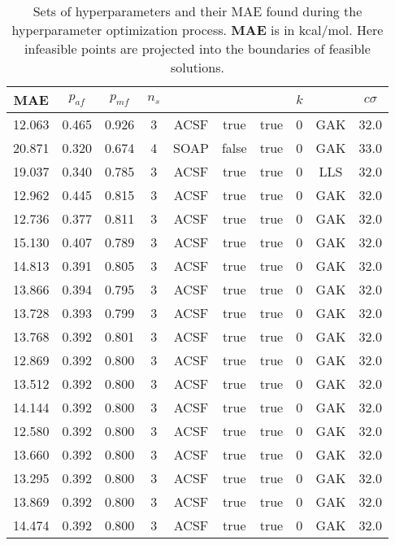 \documentclass[12pt]{article}
\begin{document}
\begin{table}[H]
	\centering
	\caption{Sets of hyperparameters and their MAE found during the hyperparameter optimization process. \textbf{MAE} is in kcal/mol. Here infeasible points are projected into the boundaries of feasible solutions.} 
	\begin{tabular}{|c|c|c|c|c|c|c|c|c|c|}
		\hline
		\textbf{MAE}	& $p_{af}$ & $p_{mf}$ & $n_s$ & \codeword{ftype} & \codeword{norm_af} & \codeword{norm_mf} & $k$ & \codeword{model} & $c\sigma$	\\ \hline
		12.063	& 0.465	& 0.926	& 3	& ACSF	& true	& true	& 0	& GAK	& 32.0	\\ \hline
		20.871	& 0.320	& 0.674	& 4	& SOAP	& false	& true	& 0	& GAK	& 33.0	\\ \hline
		19.037	& 0.340	& 0.785	& 3	& ACSF	& true	& true	& 0	& LLS	& 32.0	\\ \hline
		12.962	& 0.445	& 0.815	& 3	& ACSF	& true	& true	& 0	& GAK	& 32.0	\\ \hline
		12.736	& 0.377	& 0.811	& 3	& ACSF	& true	& true	& 0	& GAK	& 32.0	\\ \hline
		15.130	& 0.407	& 0.789	& 3	& ACSF	& true	& true	& 0	& GAK	& 32.0	\\ \hline
		14.813	& 0.391	& 0.805	& 3	& ACSF	& true	& true	& 0	& GAK	& 32.0	\\ \hline
		13.866	& 0.394	& 0.795	& 3	& ACSF	& true	& true	& 0	& GAK	& 32.0	\\ \hline
		13.728	& 0.393	& 0.799	& 3	& ACSF	& true	& true	& 0	& GAK	& 32.0	\\ \hline
		13.768	& 0.392	& 0.801	& 3	& ACSF	& true	& true	& 0	& GAK	& 32.0	\\ \hline
		12.869	& 0.392	& 0.800	& 3	& ACSF	& true	& true	& 0	& GAK	& 32.0	\\ \hline
		13.512	& 0.392	& 0.800	& 3	& ACSF	& true	& true	& 0	& GAK	& 32.0	\\ \hline
		14.144	& 0.392	& 0.800	& 3	& ACSF	& true	& true	& 0	& GAK	& 32.0	\\ \hline
		12.580	& 0.392	& 0.800	& 3	& ACSF	& true	& true	& 0	& GAK	& 32.0	\\ \hline
		13.660	& 0.392	& 0.800	& 3	& ACSF	& true	& true	& 0	& GAK	& 32.0	\\ \hline
		13.295	& 0.392	& 0.800	& 3	& ACSF	& true	& true	& 0	& GAK	& 32.0	\\ \hline
		13.869	& 0.392	& 0.800	& 3	& ACSF	& true	& true	& 0	& GAK	& 32.0	\\ \hline
		14.474	& 0.392	& 0.800	& 3	& ACSF	& true	& true	& 0	& GAK	& 32.0	\\ \hline

\end{tabular}
\end{table}
\end{document}
